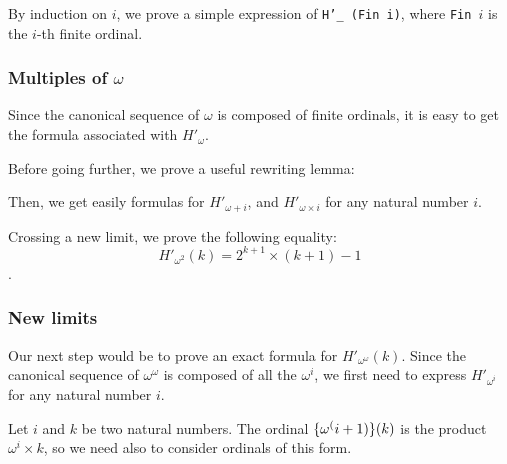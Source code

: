By induction on $i$, we prove a simple expression of \texttt{H'\_ (Fin i)}, where 
\texttt{Fin $i$}  is the $i$-th finite ordinal.




\subsubsection{Multiples of \texorpdfstring{$\omega$}{omega}}

Since the canonical sequence of $\omega$ is composed of finite ordinals, 
it is easy to get the formula associated with $H'_\omega$.



Before going further, we prove a useful rewriting lemma:





Then, we get easily formulas for $H'_{\omega+i}$, and $H'_{\omega\times i}$ for any natural number $i$.








Crossing a new limit, we prove the following equality: 
$$H'_{\omega^2} (k) = 2 ^ {k+1} \times (k+1) - 1$$.




\subsubsection{New limits}

Our next step would be to prove an exact formula for $H'_{\omega^\omega}(k)$.
Since the canonical sequence of $\omega^\omega$ is composed of all the
$\omega^i$, we first need to express $H'_{\omega^i}$ for any natural number $i$.

Let $i$ and $k$ be two natural numbers. 
The ordinal $\mbox{$\{\omega^(i+1)\}(k)$}$ is the product
$\omega^i \times k$, so we need also to consider ordinals of this form.

